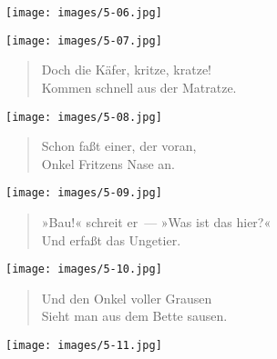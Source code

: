 \documentclass[a4paper,12pt]{article}
\begin{document}
\begin{center}\texttt{[image: images/5-06.jpg]}\end{center}




\begin{center}\texttt{[image: images/5-07.jpg]}\end{center}



\begin{verse}
Doch die Käfer, kritze, kratze!\\{}
Kommen schnell aus der Matratze.
\end{verse}



\begin{center}\texttt{[image: images/5-08.jpg]}\end{center}



\begin{verse}
Schon faßt einer, der voran,\\{}
Onkel Fritzens Nase an.
\end{verse}



\begin{center}\texttt{[image: images/5-09.jpg]}\end{center}



\begin{verse}
»Bau!« schreit er~— »Was ist das hier?«\\{}
Und erfaßt das Ungetier.
\end{verse}



\begin{center}\texttt{[image: images/5-10.jpg]}\end{center}



\begin{verse}
Und den Onkel voller Grausen\\{}
Sieht man aus dem Bette sausen.
\end{verse}



\begin{center}\texttt{[image: images/5-11.jpg]}\end{center}
\end{document}

